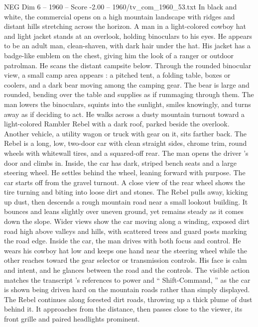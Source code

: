 \begin{textsample}{NEG Dim 6 – 1960 – Score -2.00 – 1960/tv\_com\_1960\_53.txt}  \label{ex:f6_neg_072}
In black and white, the commercial opens on a high mountain landscape with ridges and distant hills stretching across the horizon.
A man in a light-colored cowboy hat and light jacket stands at an overlook, holding binoculars to his eyes.
He appears to be an adult man, clean-shaven, with dark hair under the hat.
His jacket has a badge-like emblem on the chest, giving him the look of a ranger or outdoor patrolman.
He scans the distant campsite below.
Through the rounded binocular view, a small camp area appears : a pitched tent, a folding table, boxes or coolers, and a dark bear moving among the camping gear.
The bear is large and rounded, bending over the table and supplies as if rummaging through them.
The man lowers the binoculars, squints into the sunlight, smiles knowingly, and turns away as if deciding to act.
He walks across a dusty mountain turnout toward a light-colored Rambler Rebel with a dark roof, parked beside the overlook.
Another vehicle, a utility wagon or truck with gear on it, sits farther back.
The Rebel is a long, low, two-door car with clean straight sides, chrome trim, round wheels with whitewall tires, and a squared-off rear.
The man opens the driver ’s door and climbs in.
Inside, the car has dark, striped bench seats and a large steering wheel.
He settles behind the wheel, leaning forward with purpose.
The car starts off from the gravel turnout.
A close view of the rear wheel shows the tire turning and biting into loose dirt and stones.
The Rebel pulls away, kicking up dust, then descends a rough mountain road near a small lookout building.
It bounces and leans slightly over uneven ground, yet remains steady as it comes down the slope.
Wider views show the car moving along a winding, exposed dirt road high above valleys and hills, with scattered trees and guard posts marking the road edge.
Inside the car, the man drives with both focus and control.
He wears his cowboy hat low and keeps one hand near the steering wheel while the other reaches toward the gear selector or transmission controls.
His face is calm and intent, and he glances between the road and the controls.
The visible action matches the transcript ’s references to power and “ Shift-Command, ” as the car is shown being driven hard on the mountain roads rather than simply displayed.
The Rebel continues along forested dirt roads, throwing up a thick plume of dust behind it.
It approaches from the distance, then passes close to the viewer, its front grille and paired headlights prominent.

\end{textsample}
